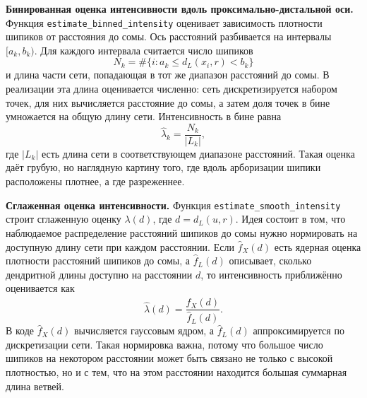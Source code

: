 \documentclass[12pt,a4paper]{article}
\begin{document}
\noindent\textbf{Бинированная оценка интенсивности вдоль проксимально-дистальной оси.}
Функция \texttt{estimate\_binned\_intensity} оценивает зависимость плотности шипиков от расстояния до сомы. Ось расстояний разбивается на интервалы \([a_k,b_k)\). Для каждого интервала считается число шипиков
\[
N_k=\#\{i:a_k\leq d_L(x_i,r)<b_k\}
\]
и длина части сети, попадающая в тот же диапазон расстояний до сомы. В реализации эта длина оценивается численно: сеть дискретизируется набором точек, для них вычисляется расстояние до сомы, а затем доля точек в бине умножается на общую длину сети. Интенсивность в бине равна
\[
\hat\lambda_k=\frac{N_k}{|L_k|},
\]
где \(|L_k|\) есть длина сети в соответствующем диапазоне расстояний. Такая оценка даёт грубую, но наглядную картину того, где вдоль арборизации шипики расположены плотнее, а где разреженнее.

\noindent\textbf{Сглаженная оценка интенсивности.}
Функция \texttt{estimate\_smooth\_intensity} строит сглаженную оценку \(\lambda(d)\), где \(d=d_L(u,r)\). Идея состоит в том, что наблюдаемое распределение расстояний шипиков до сомы нужно нормировать на доступную длину сети при каждом расстоянии. Если \(\hat f_X(d)\) есть ядерная оценка плотности расстояний шипиков до сомы, а \(\hat f_L(d)\) описывает, сколько дендритной длины доступно на расстоянии \(d\), то интенсивность приближённо оценивается как
\[
\hat\lambda(d)=\frac{\hat f_X(d)}{\hat f_L(d)}.
\]
В коде \(\hat f_X(d)\) вычисляется гауссовым ядром, а \(\hat f_L(d)\) аппроксимируется по дискретизации сети. Такая нормировка важна, потому что большое число шипиков на некотором расстоянии может быть связано не только с высокой плотностью, но и с тем, что на этом расстоянии находится большая суммарная длина ветвей.
\end{document}
